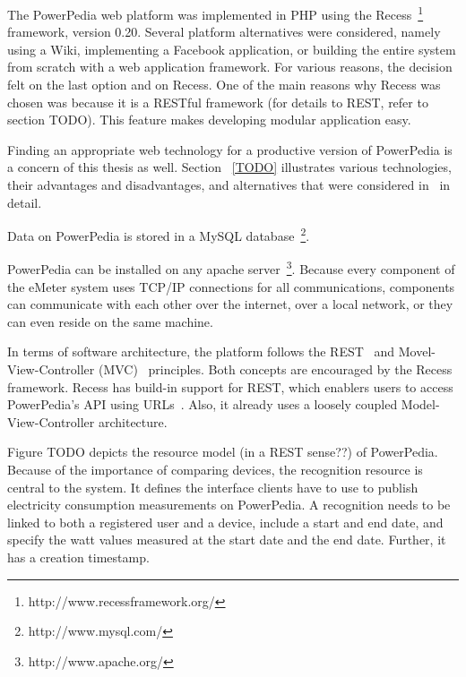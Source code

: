 The PowerPedia web platform was implemented in PHP using the Recess~\footnote{http://www.recessframework.org/} framework, version 0.20. Several platform alternatives were considered, namely using a Wiki, implementing a Facebook application, or building the entire system from scratch with a web application framework. For various reasons, the decision felt on the last option and on Recess. 
One of the main reasons why Recess was chosen was because it is a RESTful framework (for details to REST, refer to section TODO). This feature makes developing modular application easy.

Finding an appropriate web technology for a productive version of PowerPedia is a concern of this thesis as well. Section ~\ref{TODO} illustrates various technologies, their advantages and disadvantages, and alternatives that were considered in~\cite{merklepp} in detail.  

Data on PowerPedia is stored in a MySQL database~\footnote{http://www.mysql.com/}.
  

PowerPedia can be installed on any apache server~\footnote{http://www.apache.org/}. Because every component of the eMeter system uses TCP/IP connections for all communications, components can communicate with each other over the internet, over a local network, or they can even reside on the same machine.

In terms of software architecture, the platform follows the REST~\cite{Fielding2000} and Movel-View-Controller (MVC)~\cite{} principles. Both concepts are encouraged by the Recess framework. Recess has build-in support for REST, which enablers users to access PowerPedia's API using URLs~\cite{weiss:inprocPUC:2012}. Also, it already uses a loosely coupled Model-View-Controller architecture.
 

Figure TODO depicts the resource model (in a REST sense??) of PowerPedia. Because of the importance of comparing devices, the recognition resource is central to the system. It defines the interface clients have to use to publish electricity consumption measurements on PowerPedia. A recognition needs to be linked to both a registered user and a device, include a start and end date, and specify the watt values measured at the start date and the end date. Further, it has a creation timestamp.

